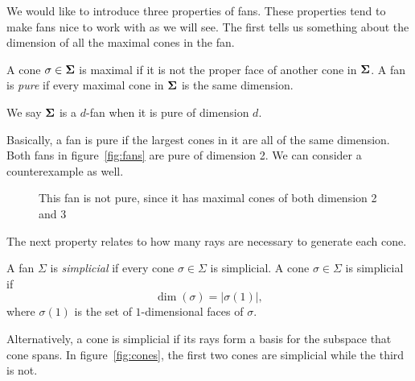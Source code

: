 \documentclass[12pt,oneside]{../../sfsuthesis}
\begin{document}
We would like to introduce three properties of fans.
These properties tend to make fans nice to work with as we will see.
The first tells us something about the dimension of all the maximal cones in the fan.
\begin{definition}[Pure]\th\label{def:pure}
    A cone \(\sigma \in \bm{\Sigma} \) is maximal if it is not the proper face of another cone in \( \bm{\Sigma} \).
    A fan is \emph{pure} if every maximal cone in \( \bm{\Sigma} \) is the same dimension.

    We say \( \bm{\Sigma} \) is a \( d \)-fan when it is pure of dimension \( d \).
\end{definition}
Basically, a fan is pure if the largest cones in it are all of the same dimension.
Both fans in figure~\ref{fig:fans} are pure of dimension 2.
We can consider a counterexample as well.
\begin{figure}[H]
    \centering
    \caption{This fan is not pure, since it has maximal cones of both dimension 2 and 3}
\end{figure}
The next property relates to how many rays are necessary to generate each cone.
\begin{definition}\th\label{def:simplicial}
    A fan \( \Sigma \) is \emph{simplicial} if every cone \( \sigma \in \Sigma \) is simplicial.
    A cone \( \sigma \in \Sigma \) is simplicial if
    \[
        \dim (\sigma)  = |\sigma(1)|,
    \]
    where \( \sigma(1) \) is the set of \( 1 \)-dimensional faces of \( \sigma \).
\end{definition}
Alternatively, a cone is simplicial if its rays form a basis for the subspace that cone spans.
In figure~\ref{fig:cones}, the first two cones are simplicial while the third is not.
\end{document}
